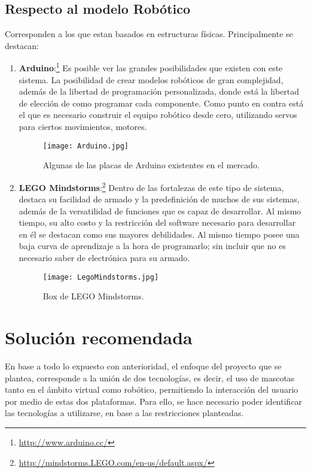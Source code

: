\subsection{Respecto al modelo Rob\'otico}
 Corresponden a los que estan basados en estructuras f\'isicas. Principalmente se destacan:
  \begin{enumerate}
  \item {\bf Arduino}:\footnote{\url{http://www.arduino.cc/}} Es posible ver las grandes posibilidades que existen con este sistema. La posibilidad de crear modelos rob\'oticos de gran complejidad, adem\'as de la libertad de programaci\'on personalizada, donde est\'a la libertad de elecci\'on de como programar cada componente. Como punto en contra est\'a el que es necesario construir el equipo rob\'otico desde cero, utilizando servos para ciertos movimientos, motores.
\begin{figure}[H]
  \centering
  \texttt{[image: Arduino.jpg]}
  \caption[~Placas de Arduino]{Algunas de las placas de Arduino existentes en el mercado.}
  \label{fig:Arduino}
\end{figure}

  \item {\bf LEGO Mindstorms}:\footnote{\url{http://mindstorms.LEGO.com/en-us/default.aspx/}} Dentro de las fortalezas de este tipo de sistema, destaca su facilidad de armado y la predefinici\'on de muchos de sus sistemas, adem\'as de la versatilidad de funciones que es capaz de desarrollar. Al mismo tiempo, su alto costo y la restricci\'on del software necesario para desarrollar en \'el se destacan como sus mayores debilidades. Al mismo tiempo posee una baja curva de aprendizaje a la hora de programarlo; sin incluir que no es necesario saber de electr\'onica para su armado.
\begin{figure}[H]
  \centering
  \texttt{[image: LegoMindstorms.jpg]}
  \caption[~LEGO Mindstorms]{Box de LEGO Mindstorms.}
  \label{fig:LegoMindstorms}
\end{figure}

  \end{enumerate}

\newpage
\section{Soluci\'on recomendada}

En base a todo lo expuesto con anterioridad, el enfoque del proyecto que se plantea, co\-rres\-pon\-de a la uni\'on de dos tecnolog\'ias, es decir, el uso de mascotas tanto en el \'ambito virtual como rob\'otico, permitiendo la interacci\'on del usuario por medio de estas dos plataformas. Para ello, se hace necesario poder identificar las tecnolog\'ias a utilizarse, en base a las restricciones planteadas.

